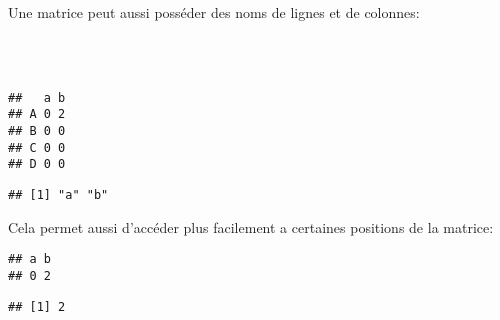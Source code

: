 Une matrice peut aussi posséder des noms de lignes et de colonnes:

\begin{knitrout}
\color{fgcolor}\begin{kframe}
\begin{flushleft}
\ttfamily\noindent
{}\hlkeyword{(}\hlkeyword{)}{\ }\hlassignement{\usebox{\hlnormalsizeboxlessthan}-}{\ }\hlkeyword{(}\hlkeyword{,}{\ }\hlkeyword{)}\hspace*{\fill}\\
\hlstd{}\hlkeyword{(}\hlkeyword{)}{\ }\hlassignement{\usebox{\hlnormalsizeboxlessthan}-}{\ }\hlkeyword{(}\hlkeyword{,}{\ }\hlkeyword{,}{\ }\hlkeyword{,}{\ }\hlkeyword{)}\hspace*{\fill}\\
\hlstd{}\mbox{}
\normalfont
\end{flushleft}
\begin{verbatim}
##   a b
## A 0 2
## B 0 0
## C 0 0
## D 0 0
\end{verbatim}
\begin{flushleft}
\ttfamily\noindent
{}\hlkeyword{(}\hlkeyword{)}\mbox{}
\normalfont
\end{flushleft}
\begin{verbatim}
## [1] "a" "b"
\end{verbatim}
\end{kframe}
\end{knitrout}


Cela permet aussi d'accéder plus facilement a certaines positions de la matrice:

\begin{knitrout}
\color{fgcolor}\begin{kframe}
\begin{flushleft}
\ttfamily\noindent
{}\hlkeyword{[}\hlkeyword{,}{\ }\hlkeyword{]}\mbox{}
\normalfont
\end{flushleft}
\begin{verbatim}
## a b 
## 0 2 
\end{verbatim}
\begin{flushleft}
\ttfamily\noindent
{}\hlkeyword{[}\hlkeyword{,}{\ }\hlkeyword{]}\mbox{}
\normalfont
\end{flushleft}
\begin{verbatim}
## [1] 2
\end{verbatim}
\end{kframe}
\end{knitrout}


